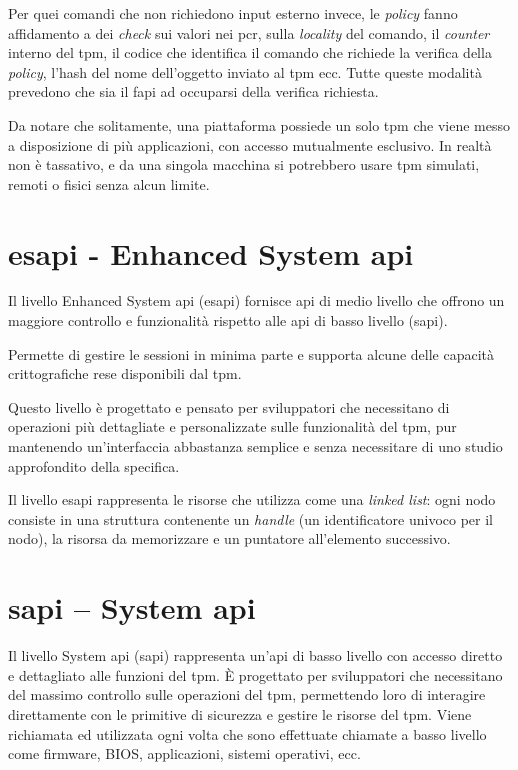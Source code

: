 Per quei comandi che non richiedono input esterno invece, le \textit{policy} fanno affidamento a dei \textit{check} sui valori nei \acrshort{pcr}, sulla \textit{locality} del comando, il \textit{counter} interno del \acrshort{tpm}, il codice che identifica il comando che richiede la verifica della \textit{policy}, l'hash del nome dell'oggetto inviato al \acrshort{tpm} ecc. Tutte queste modalità prevedono che sia il \acrshort{fapi} ad occuparsi della verifica richiesta.

Da notare che solitamente, una piattaforma possiede un solo \acrshort{tpm} che viene messo a disposizione di più applicazioni, con accesso mutualmente esclusivo. In realtà non è tassativo, e da una singola macchina si potrebbero usare \acrshort{tpm} simulati, remoti o fisici senza alcun limite.

\section{\acrshort{esapi} - Enhanced System \acrshort{api}}\label{sec:esapi}

Il livello Enhanced System \acrshort{api} (\acrshort{esapi}) fornisce \acrshort{api} di medio livello che offrono un maggiore controllo e funzionalità rispetto alle \acrshort{api} di basso livello (\acrshort{sapi}). 

Permette di gestire le sessioni in minima parte e supporta alcune delle capacità crittografiche rese disponibili dal \acrshort{tpm}. 

Questo livello è progettato e pensato per sviluppatori che necessitano di operazioni più dettagliate e personalizzate sulle funzionalità del \acrshort{tpm}, pur mantenendo un'interfaccia abbastanza semplice e senza necessitare di uno studio approfondito della specifica.

Il livello \acrshort{esapi} rappresenta le risorse che utilizza come una \textit{linked list}: ogni nodo consiste in una struttura contenente un \textit{handle} (un identificatore univoco per il nodo), la risorsa da memorizzare e un puntatore all'elemento successivo. 

\section{\acrshort{sapi} -- System \acrshort{api}}\label{sec:sapi}

Il livello System \acrshort{api} (\acrshort{sapi}) rappresenta un'\acrshort{api} di basso livello con accesso diretto e dettagliato alle funzioni del \acrshort{tpm}. È progettato per sviluppatori che necessitano del massimo controllo sulle operazioni del \acrshort{tpm}, permettendo loro di interagire direttamente con le primitive di sicurezza e gestire le risorse del \acrshort{tpm}. Viene richiamata ed utilizzata ogni volta che sono effettuate chiamate a basso livello come firmware, BIOS, applicazioni, sistemi operativi, ecc. 


